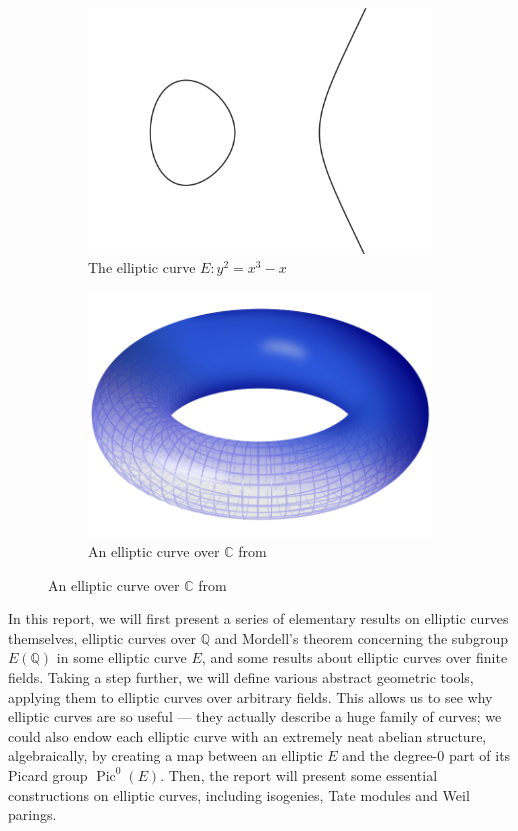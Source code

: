 \documentclass[12pt]{article}
\theoremstyle{remark}
\theoremstyle{definition}
\newcommand{\Q}[0]{\mathbb{Q}}
\newcommand{\C}[0]{\mathbb{C}}
\newcommand{\Pic}[0]{\operatorname{Pic}}
\begin{document}
        \begin{figure}[h]
        \centering
        \begin{subfigure}{.5\textwidth}
        \centering
        \includegraphics[width=.7\linewidth]{figures/5.png}
        \caption{The elliptic curve $E:y^2=x^3-x$}
        \label{figure-vis1}
        \end{subfigure}%
        \begin{subfigure}{.5\textwidth}
        \centering
        \includegraphics[width=.7\linewidth]{figures/6.png}
        
        \caption{An elliptic curve over $\C$ from \cite{torus}}
        \label{figure-vis2}
        \end{subfigure}
        \end{figure}
        
        In this report, we will first present a series of elementary results on elliptic curves themselves, elliptic curves over $\Q$ and Mordell's theorem concerning the subgroup $E(\Q)$ in some elliptic curve $E$, and some results about elliptic curves over finite fields. Taking a step further, we will define various abstract geometric tools, applying them to elliptic curves over arbitrary fields. This allows us to see why elliptic curves are so useful --- they actually describe a huge family of curves; we could also endow each elliptic curve with an extremely neat abelian structure, algebraically, by creating a map between an elliptic $E$ and the degree-$0$ part of its Picard group $\Pic^0(E)$. Then, the report will present some essential constructions on elliptic curves, including isogenies, Tate modules and Weil parings.
    
\end{document}
